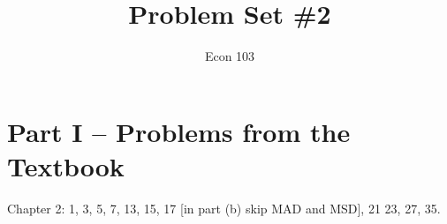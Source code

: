 \documentclass[addpoints,12pt]{exam}
\title{Problem Set \#2}
\author{Econ 103}
\date{}
\begin{document}
\maketitle

\section*{Part I -- Problems from the Textbook}
Chapter 2: 1, 3, 5, 7, 13, 15, 17 [in part (b) skip MAD and MSD], 21 23, 27, 35. 

\end{document}
